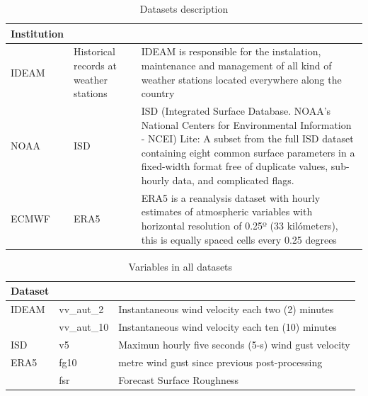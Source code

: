 \documentclass[12pt,oneside]{reedthesis}
\begin{document}
\begingroup\fontsize{10}{12}\selectfont
\begin{longtable}[t]{l>{\raggedright\arraybackslash}p{0.8in}>{\raggedright\arraybackslash}p{4in}}
\caption[Datasets Description]{\label{tab:tabledatasources1}Datasets description}\\
\toprule
\multicolumn{1}{l}{Institution} & \multicolumn{1}{l}{Dataset} & \multicolumn{1}{l}{Details}\\
\midrule
IDEAM & Historical records at weather stations & IDEAM is responsible for the instalation, maintenance and management of all kind of weather stations located everywhere along the country\\
NOAA & ISD & ISD (Integrated Surface Database. NOAA's National Centers for Environmental Information - NCEI) Lite: A subset from the full ISD dataset containing eight common surface parameters in a fixed-width format free of duplicate values, sub-hourly data, and complicated flags.\\
ECMWF & ERA5 & ERA5 is a reanalysis dataset with hourly estimates of atmospheric variables with horizontal resolution of 0.25º (33 kilómeters), this is equally spaced cells every 0.25 degrees\\
\bottomrule
\end{longtable}
\endgroup{}

\begingroup\fontsize{10}{12}\selectfont
\begin{longtable}[t]{l>{\raggedright\arraybackslash}p{1.2in}>{\raggedright\arraybackslash}p{3.5in}}
\caption[Datasets Variables]{\label{tab:tabledatasources2}Variables in all datasets}\\
\toprule
\multicolumn{1}{l}{Dataset} & \multicolumn{1}{l}{Variables} & \multicolumn{1}{l}{Description}\\
\midrule
IDEAM & vv\_aut\_2 & Instantaneous wind velocity each two (2) minutes\\
 & vv\_aut\_10 & Instantaneous wind velocity each ten (10) minutes\\
ISD & v5 & Maximun hourly five seconds (5-s) wind gust velocity\\
ERA5 & fg10 & 10 metre wind gust since previous post-processing\\
 & fsr & Forecast Surface Roughness\\
\bottomrule
\end{longtable}
\endgroup{}
\end{document}
